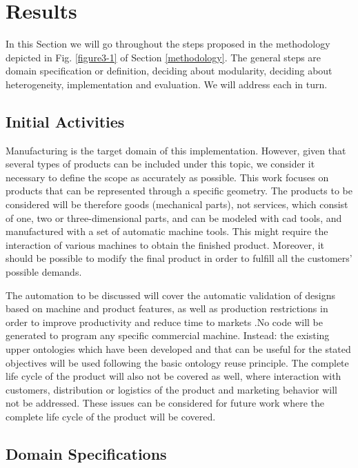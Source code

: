 \section{Results}\label{chapter4}

In this Section we will go throughout the steps proposed in the methodology depicted in Fig. \ref{figure3-1} of Section \ref{methodology}. The general steps are domain specification or definition, deciding about modularity, deciding about heterogeneity, implementation and evaluation. We will address each in turn. 



\subsection{Initial Activities }\label{section4.1}

Manufacturing is the target domain of this implementation. However, given that several types of products can be included under this topic, we consider it necessary to define the scope as accurately as possible. This work  focuses on products that can be represented through a specific geometry. The products to be considered will be therefore goods (mechanical parts), not services, which consist of one, two or three-dimensional parts, and can be modeled with \gls{cad} tools, and manufactured with a set of automatic machine tools. This might require the interaction of various machines to obtain the finished product. Moreover, it should be possible to modify the final product in order to fulfill all the customers’ possible demands.

The automation to be discussed will cover the automatic validation of designs based on machine and product features, as well as production restrictions  in order to improve productivity and reduce time to markets \cite{dorr_cad-cam_1987}.No code will be generated to program any specific commercial machine. Instead: the existing upper ontologies which have been developed and that can be useful for the stated objectives will be used following the basic ontology reuse principle. The complete life cycle of the product will also not be covered as well, where  interaction with customers, distribution or logistics of the product and marketing behavior will not be addressed. These issues can be considered for future work where the complete life cycle of the product will be covered.

\subsection{Domain Specifications }\label{4.1.1}

